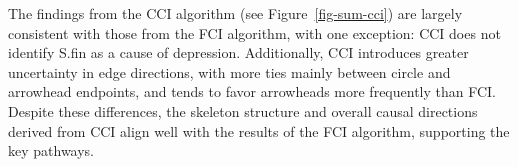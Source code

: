 \documentclass[
]{article}
\begin{document}
The findings from the CCI algorithm (see Figure~\ref{fig-sum-cci}) are
largely consistent with those from the FCI algorithm, with one
exception: CCI does not identify S.fin as a cause of depression.
Additionally, CCI introduces greater uncertainty in edge directions,
with more ties mainly between circle and arrowhead endpoints, and tends
to favor arrowheads more frequently than FCI. Despite these differences,
the skeleton structure and overall causal directions derived from CCI
align well with the results of the FCI algorithm, supporting the key
pathways.

\begin{figure}

\begin{minipage}{0.50\linewidth}



\end{minipage}%
%
\begin{minipage}{0.50\linewidth}

\centering{

}
\end{minipage}
\end{figure}
\end{document}
